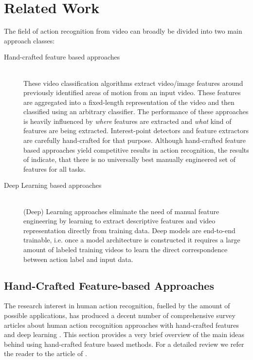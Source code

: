 \section{Related Work}
The field of action recognition from video can broadly be divided into two main approach classes:
\begin{description}
    \item[Hand-crafted feature based approaches] \hfill \\
    These video classification algorithms extract video/image features around previously identified areas of motion from an input video.
    These features are aggregated into a fixed-length representation of the video and then classified using an arbitrary classifier.
    The performance of these approaches is heavily influenced by \textit{where} features are extracted and \textit{what} kind of features are being extracted.
    Interest-point detectors and feature extractors are carefully hand-crafted for that purpose.
    Although hand-crafted feature based approaches yield competitive results in action recognition, the results of \textcite{wang_evaluation_2009} indicate, that there is no universally best manually engineered set of features for all tasks.
    \item[Deep Learning based approaches] \hfill \\
    (Deep) Learning approaches eliminate the need of manual feature engineering by learning to extract descriptive features and video representation directly from training data.
    Deep models are end-to-end trainable, i.e. once a model architecture is constructed it requires a large amount of labeled training videos to learn the direct correspondence between action label and input data.
\end{description}


\subsection{Hand-Crafted Feature-based Approaches}
The research interest in human action recognition, fuelled by the amount of possible applications, has produced a decent number of comprehensive survey articles about human action recognition approaches with hand-crafted features and deep learning
\cite{poppe_survey_2010, aggarwal_human_2011, chaquet_survey_2013, langkvist_review_2014, herath_going_2016, kang_review_2016}.
This section provides a very brief overview of the main ideas behind using hand-crafted feature based methods.
For a detailed review we refer the reader to the article of \textcite{poppe_survey_2010}.


